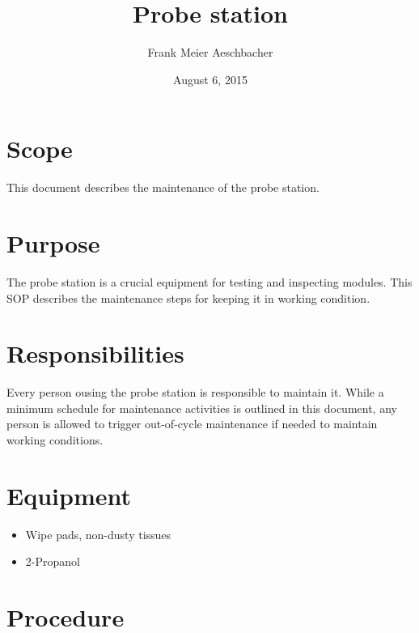 \documentclass[12pt]{unlsilabsop}
\title{Probe station}
\date{August 6, 2015}
\author{Frank Meier Aeschbacher}
\begin{document}
\maketitle

\section{Scope}
This document describes the maintenance of the probe station.

\section{Purpose}
The probe station is a crucial equipment for testing and inspecting modules. This SOP describes the maintenance steps for keeping it in working condition.


\section{Responsibilities}
Every person ousing the probe station is responsible to maintain it. While a minimum schedule for maintenance activities is outlined in this document, any person is allowed to trigger out-of-cycle maintenance if needed to maintain working conditions.

\section{Equipment}

\begin{itemize}
    \item Wipe pads, non-dusty tissues
    \item 2-Propanol
\end{itemize}


\section{Procedure}
\end{document}
